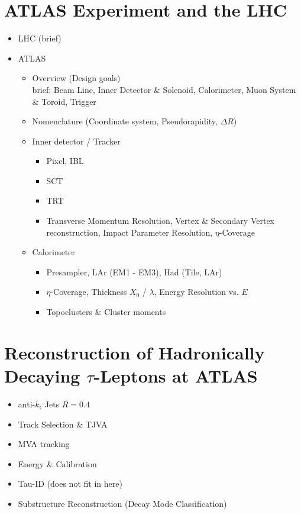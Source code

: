 \section{ATLAS Experiment and the LHC}

\begin{itemize}
\item LHC (brief)

\item ATLAS
  \begin{itemize}
  \item Overview (Design goals) \\
    brief: Beam Line, Inner Detector \& Solenoid, Calorimeter, Muon System \&
    Toroid, Trigger

  \item Nomenclature (Coordinate system, Pseudorapidity, $\Delta R$)

  \item Inner detector / Tracker
    \begin{itemize}
    \item Pixel, IBL
    \item SCT
    \item TRT
    \item  Transverse Momentum Resolution, Vertex \& Secondary Vertex
      reconstruction, Impact Parameter Resolution, $\eta$-Coverage
    \end{itemize}

  \item Calorimeter
    \begin{itemize}
    \item Presampler, LAr (EM1 - EM3), Had (Tile, LAr)
    \item $\eta$-Coverage, Thickness $X_0$ / $\lambda$, Energy Resolution
      vs. $E$
    \item Topoclusters \& Cluster moments
    \end{itemize}

  \end{itemize}
\end{itemize}

\section{Reconstruction of Hadronically Decaying $\tau$-Leptons at ATLAS}

\begin{itemize}
\item anti-$k_\mathrm{t}$ Jets $R = 0.4$
\item Track Selection \& TJVA
\item MVA tracking
\item Energy \& Calibration
\item Tau-ID (does not fit in here)
\item Substructure Reconstruction (Decay Mode Classification)
\end{itemize}

